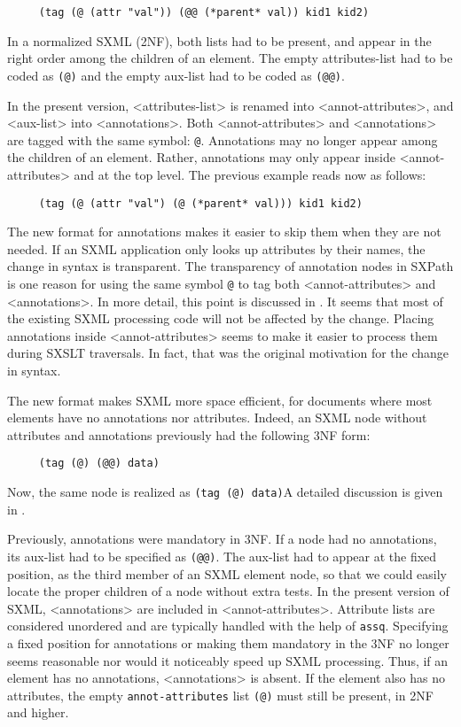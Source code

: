 \documentclass[10pt]{article}
\begin{document}
\begin{verbatim}
     (tag (@ (attr "val")) (@@ (*parent* val)) kid1 kid2)
\end{verbatim}
In a normalized SXML (2NF), both lists had to be present, and
appear in the right order among the children of an element. The empty
attributes-list had to be coded as \texttt{(@)} and the empty
aux-list had to be coded as \texttt{(@@)}.

In the present version, <attributes-list> is renamed into
<annot-attributes>, and <aux-list> into
<annotations>.  Both <annot-attributes> and
<annotations> are tagged with the same symbol: \texttt{@}. Annotations may no longer appear among the children of an
element. Rather, annotations may only appear inside
<annot-attributes> and at the top level. The previous
example reads now as follows:

\begin{verbatim}
     (tag (@ (attr "val") (@ (*parent* val))) kid1 kid2)
\end{verbatim}
The new format for annotations makes it easier to skip them
when they are not needed. If an SXML application only looks up attributes by
their names, the change in syntax is transparent.  The transparency of
annotation nodes in SXPath is one reason for using the same symbol
\texttt{@} to tag both <annot-attributes> and <annotations>. In more detail,
this point is discussed in \cite{Annotations}. It seems that
most of the existing SXML processing code will not be affected by the
change. Placing annotations inside <annot-attributes>
seems to make it easier to process them during SXSLT traversals. In
fact, that was the original motivation for the change in syntax.

The new format makes SXML more space efficient, for documents
where most elements have no annotations nor attributes. Indeed, an
SXML node without attributes and annotations previously had the
following 3NF form:

\begin{verbatim}
     (tag (@) (@@) data)
\end{verbatim}
Now, the same node is realized as \texttt{(tag (@) data)}A detailed discussion is given in \cite{Annotations}. 

Previously, annotations were mandatory in 3NF. If a node had
no annotations, its aux-list had to be specified as \texttt{(@@)}. The aux-list had to appear at the fixed position, as
the third member of an SXML element node, so that we could easily
locate the proper children of a node without extra tests. In the
present version of SXML, <annotations> are included in
<annot-attributes>. Attribute lists are considered
unordered and are typically handled with the help of \texttt{assq}. Specifying a fixed position for annotations or making them
mandatory in the 3NF no longer seems reasonable nor would it
noticeably speed up SXML processing. Thus, if an element has no
annotations, <annotations> is absent. If the
element also has no attributes, the empty \texttt{annot-attributes} list \texttt{(@)} must still be present, in 2NF
and higher.
\end{document}
